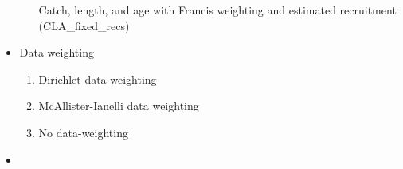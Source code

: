\documentclass[11pt,
  english,
  a4paper,
]{article}
\begin{document}
\begin{itemize}
\begin{enumerate}

    Catch, length, and age with Francis weighting and estimated recruitment (CLA\_fixed\_recs)

    \tagmcend\tagstructend\tagstructend

    \tagmcend\tagstructend\tagstructend
  \end{enumerate}

  \tagstructend
\item

  Data weighting

  \tagmcend\tagstructend\tagstructend


  \begin{enumerate}
  \def\labelenumi{\arabic{enumi}.}
  \setcounter{enumi}{5}
  \item


    Dirichlet data-weighting

    \tagmcend\tagstructend\tagstructend

    \tagmcend\tagstructend\tagstructend
  \item


    McAllister-Ianelli data weighting

    \tagmcend\tagstructend\tagstructend

    \tagmcend\tagstructend\tagstructend
  \item


    No data-weighting

    \tagmcend\tagstructend\tagstructend

    \tagmcend\tagstructend\tagstructend
  \end{enumerate}

  \tagstructend
\item


\end{itemize}
\end{document}
